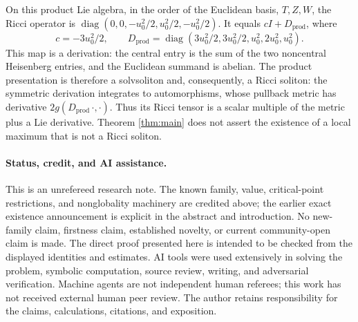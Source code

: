 \documentclass[11pt]{article}
\begin{document}
On this product Lie algebra, in the order of the Euclidean basis,
\(T,Z,W\), the Ricci operator is
\(\operatorname{diag}(0,0,-u_0^2/2,u_0^2/2,-u_0^2/2)\).
It equals \(cI+D_{\mathrm{prod}}\), where
\[
 c=-3u_0^2/2,\qquad
 D_{\mathrm{prod}}=
 \operatorname{diag}(3u_0^2/2,3u_0^2/2,u_0^2,2u_0^2,u_0^2).
\]
This map is a derivation: the central entry is the sum of the two
noncentral Heisenberg entries, and the Euclidean summand is abelian.
The product presentation is therefore a solvsoliton and, consequently,
a Ricci soliton: the symmetric derivation integrates to automorphisms,
whose pullback metric has derivative \(2g(D_{\mathrm{prod}}\,\cdot,\cdot)\).
Thus its Ricci tensor is a scalar multiple of the metric plus a Lie
derivative. Theorem \ref{thm:main} does not assert the existence of
a local maximum that is not a Ricci soliton.

\paragraph{Status, credit, and AI assistance.}
This is an unrefereed research note. The known family,
value, critical-point restrictions, and nonglobality machinery are
credited above; the earlier exact existence announcement is explicit
in the abstract and introduction. No new-family claim, firstness
claim, established novelty, or current community-open claim is made.
The direct proof presented here is intended to be checked from the
displayed identities and estimates.
AI tools were used extensively in solving the problem, symbolic
computation, source review, writing, and adversarial verification.
Machine agents are not independent human referees; this work has not
received external human peer review. The author retains responsibility
for the claims, calculations, citations, and exposition.
\end{document}
